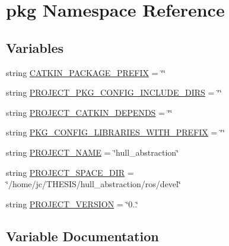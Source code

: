 \hypertarget{namespacepkg}{}\section{pkg Namespace Reference}
\label{namespacepkg}
\subsection*{Variables}
\begin{DoxyCompactItemize}
\item 
string \hyperlink{namespacepkg_ae26c7a5a06b7d738f4d210ca449e6bee}{C\+A\+T\+K\+I\+N\+\_\+\+P\+A\+C\+K\+A\+G\+E\+\_\+\+P\+R\+E\+F\+IX} = \char`\"{}\char`\"{}
\item 
string \hyperlink{namespacepkg_a2760bf8266ff58da440f65ee91b203ab}{P\+R\+O\+J\+E\+C\+T\+\_\+\+P\+K\+G\+\_\+\+C\+O\+N\+F\+I\+G\+\_\+\+I\+N\+C\+L\+U\+D\+E\+\_\+\+D\+I\+RS} = \char`\"{}\char`\"{}
\item 
string \hyperlink{namespacepkg_a17c18447fad253ee1c0d76deec88028c}{P\+R\+O\+J\+E\+C\+T\+\_\+\+C\+A\+T\+K\+I\+N\+\_\+\+D\+E\+P\+E\+N\+DS} = \char`\"{}\char`\"{}
\item 
string \hyperlink{namespacepkg_a433e30cecb4a0123a7c4b384d168e336}{P\+K\+G\+\_\+\+C\+O\+N\+F\+I\+G\+\_\+\+L\+I\+B\+R\+A\+R\+I\+E\+S\+\_\+\+W\+I\+T\+H\+\_\+\+P\+R\+E\+F\+IX} = \char`\"{}\char`\"{}
\item 
string \hyperlink{namespacepkg_a7dfbe99257c26f5e4a3a5483995d9ddc}{P\+R\+O\+J\+E\+C\+T\+\_\+\+N\+A\+ME} = \char`\"{}hull\+\_\+abstraction\char`\"{}
\item 
string \hyperlink{namespacepkg_a3f0f1b4bc03c596525e025539ca4332f}{P\+R\+O\+J\+E\+C\+T\+\_\+\+S\+P\+A\+C\+E\+\_\+\+D\+IR} = \char`\"{}/home/jc/T\+H\+E\+S\+IS/hull\+\_\+abstraction/ros/devel\char`\"{}
\item 
string \hyperlink{namespacepkg_ab1037914b9286bb61855131c06149648}{P\+R\+O\+J\+E\+C\+T\+\_\+\+V\+E\+R\+S\+I\+ON} = \char`\"{}0..\char`\"{}
\end{DoxyCompactItemize}


\subsection{Variable Documentation}
